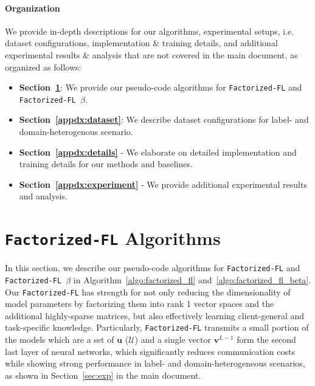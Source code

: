 \clearpage
\appendix
\onecolumn

\paragraph{Organization} We provide in-depth descriptions for our algorithms, experimental setups, i.e. dataset configurations, implementation \& training details, and additional experimental results \& analysis that are not covered in the main document, as organized as follows:

\begin{itemize}
    \item \textbf{Section~\ref{appdx:algorithm}}: We provide our pseudo-code algorithms for \texttt{Factorized-FL} and \texttt{Factorized-FL $\beta$}. 
    \item \textbf{Section~\ref{appdx:dataset}}: We describe dataset configurations for label- and domain-heterogenous scenario.
    \item \textbf{Section~\ref{appdx:details}} - We elaborate on detailed implementation and training details for our methods and baselines.
    \item \textbf{Section~\ref{appdx:experiment}} - We provide additional experimental results and analysis. 
\end{itemize}

\section{\texttt{Factorized-FL} Algorithms}
\label{appdx:algorithm}

In this section, we describe our pseudo-code algorithms for \texttt{Factorized-FL} and \texttt{Factorized-FL $\beta$} in Algorithm~\ref{algo:factorized_fl} and~\ref{algo:factorized_fl_beta}. Our \texttt{Factorized-FL} has strength for not only reducing the dimensionality of model parameters by factorizing them into rank 1 vector spaces and the additional highly-sparse matrices, but also effectively learning client-general and task-specific knowledge. Particularly, \texttt{Factorized-FL} transmits a small portion of the models which are a set of $\textbf{u}$ ($\mathcal{U}$) and a single vector $\textbf{v}^{L-1}$ form the second last layer of neural networks, which significantly reduces communication costs while showing strong performance in label- and domain-heterogeneous scenarios, as shown in Section~\ref{sec:exp} in the main document.




